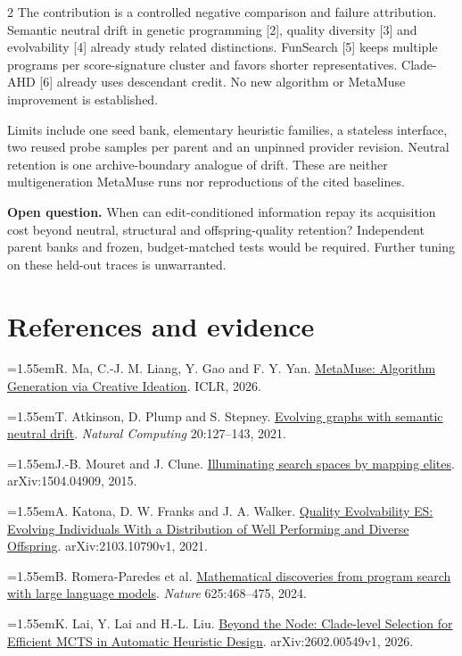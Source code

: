 \documentclass[10pt,letterpaper]{article}
\newcommand{\refentry}[2]{\par\hangindent=1.55em\hangafter=1\noindent\makebox[1.55em][l]{[#1]}#2\par}
\begin{document}
\begin{multicols}{2}
The contribution is a controlled negative comparison and failure attribution. Semantic neutral drift in genetic programming [2], quality diversity [3] and evolvability [4] already study related distinctions. FunSearch [5] keeps multiple programs per score-signature cluster and favors shorter representatives. Clade-AHD [6] already uses descendant credit. No new algorithm or MetaMuse improvement is established.

Limits include one seed bank, elementary heuristic families, a stateless interface, two reused probe samples per parent and an unpinned provider revision. Neutral retention is one archive-boundary analogue of drift. These are neither multigeneration MetaMuse runs nor reproductions of the cited baselines.

\textbf{Open question.} When can edit-conditioned information repay its acquisition cost beyond neutral, structural and offspring-quality retention? Independent parent banks and frozen, budget-matched tests would be required. Further tuning on these held-out traces is unwarranted.

\section*{References and evidence}
{\fontsize{8.7}{10.5}\selectfont\setlength{\parskip}{2pt}
\refentry{1}{R. Ma, C.-J. M. Liang, Y. Gao and F. Y. Yan. \href{https://proceedings.iclr.cc/paper_files/paper/2026/hash/85632be2cd69e9a0ef4ba054c096fac9-Abstract-Conference.html}{MetaMuse: Algorithm Generation via Creative Ideation}. ICLR, 2026.}
\refentry{2}{T. Atkinson, D. Plump and S. Stepney. \href{https://doi.org/10.1007/s11047-019-09772-4}{Evolving graphs with semantic neutral drift}. \emph{Natural Computing} 20:127--143, 2021.}
\refentry{3}{J.-B. Mouret and J. Clune. \href{https://arxiv.org/abs/1504.04909}{Illuminating search spaces by mapping elites}. arXiv:1504.04909, 2015.}
\refentry{4}{A. Katona, D. W. Franks and J. A. Walker. \href{https://arxiv.org/abs/2103.10790v1}{Quality Evolvability ES: Evolving Individuals With a Distribution of Well Performing and Diverse Offspring}. arXiv:2103.10790v1, 2021.}
\refentry{5}{B. Romera-Paredes et al. \href{https://doi.org/10.1038/s41586-023-06924-6}{Mathematical discoveries from program search with large language models}. \emph{Nature} 625:468--475, 2024.}
\refentry{6}{K. Lai, Y. Lai and H.-L. Liu. \href{https://arxiv.org/abs/2602.00549v1}{Beyond the Node: Clade-level Selection for Efficient MCTS in Automatic Heuristic Design}. arXiv:2602.00549v1, 2026.}
\par{}}
\end{multicols}
\end{document}
